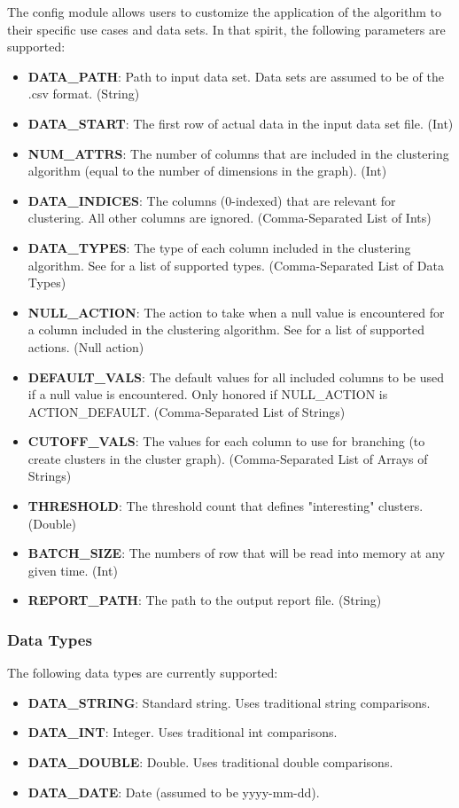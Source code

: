 \documentclass{article}
\begin{document}
The config module allows users to customize the application of the algorithm to their specific use cases and data sets. In that spirit, the following parameters are supported:
\begin{itemize}
  \item \textbf{DATA\_PATH}: Path to input data set. Data sets are assumed to be of the .csv format. (String)
  \item \textbf{DATA\_START}: The first row of actual data in the input data set file. (Int)
  \item \textbf{NUM\_ATTRS}: The number of columns that are included in the clustering algorithm (equal to the number of dimensions in the graph). (Int)
  \item \textbf{DATA\_INDICES}: The columns (0-indexed) that are relevant for clustering. All other columns are ignored. (Comma-Separated List of Ints)
  \item \textbf{DATA\_TYPES}: The type of each column included in the clustering algorithm. See  for a list of supported types. (Comma-Separated List of Data Types)
  \item \textbf{NULL\_ACTION}: The action to take when a null value is encountered for a column included in the clustering algorithm. See  for a list of supported actions. (Null action)
  \item \textbf{DEFAULT\_VALS}: The default values for all included columns to be used if a null value is encountered. Only honored if NULL\_ACTION is ACTION\_DEFAULT. (Comma-Separated List of Strings)
  \item \textbf{CUTOFF\_VALS}: The values for each column to use for branching (to create clusters in the cluster graph). (Comma-Separated List of Arrays of Strings)
  \item \textbf{THRESHOLD}: The threshold count that defines "interesting" clusters. (Double)
  \item \textbf{BATCH\_SIZE}: The numbers of row that will be read into memory at any given time. (Int)
  \item \textbf{REPORT\_PATH}: The path to the output report file. (String)
\end{itemize}

\subsubsection{Data Types}
\label{DataTypes}

The following data types are currently supported:
\begin{itemize}
    \item \textbf{DATA\_STRING}: Standard string. Uses traditional string comparisons.
    \item \textbf{DATA\_INT}: Integer. Uses traditional int comparisons.
    \item \textbf{DATA\_DOUBLE}: Double. Uses traditional double comparisons.
    \item \textbf{DATA\_DATE}: Date (assumed to be yyyy-mm-dd).
\end{itemize}
\end{document}
